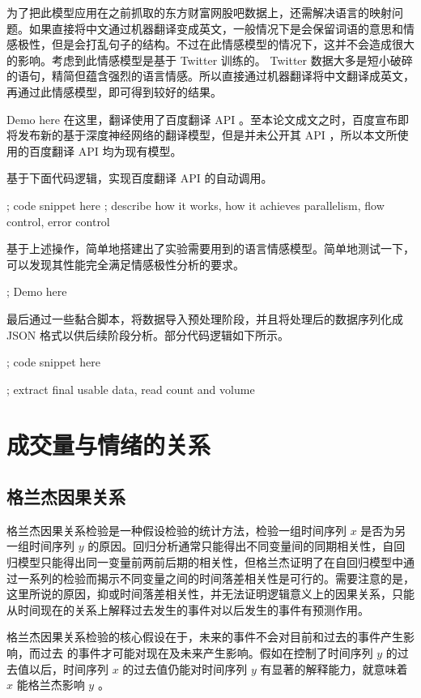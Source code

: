 为了把此模型应用在之前抓取的东方财富网股吧数据上，还需解决语言的映射问题。如果直接将中文通过机器翻译变成英文，一般情况下是会保留词语的意思和情感极性，但是会打乱句子的结构。不过在此情感模型的情况下，这并不会造成很大的影响。考虑到此情感模型是基于 Twitter 训练的。 Twitter 数据大多是短小破碎的语句，精简但蕴含强烈的语言情感。所以直接通过机器翻译将中文翻译成英文，再通过此情感模型，即可得到较好的结果。

Demo here
在这里，翻译使用了百度翻译 API 。至本论文成文之时，百度宣布即将发布新的基于深度神经网络的翻译模型，但是并未公开其 API ，所以本文所使用的百度翻译 API 均为现有模型。

基于下面代码逻辑，实现百度翻译 API 的自动调用。

; code snippet here
; describe how it works, how it achieves parallelism, flow control, error control

基于上述操作，简单地搭建出了实验需要用到的语言情感模型。简单地测试一下，可以发现其性能完全满足情感极性分析的要求。

; Demo here

最后通过一些黏合脚本，将数据导入预处理阶段，并且将处理后的数据序列化成 JSON 格式以供后续阶段分析。部分代码逻辑如下所示。

; code snippet here

; extract final usable data, read count and volume

\chapter{成交量与情绪的关系}

\section{格兰杰因果关系}

格兰杰因果关系检验\cite{granger_causality}是一种假设检验的统计方法，检验一组时间序列 $x$ 是否为另一组时间序列 $y$ 的原因。回归分析通常只能得出不同变量间的同期相关性，自回归模型只能得出同一变量前两前后期的相关性，但格兰杰证明了在自回归模型中通过一系列的检验而揭示不同变量之间的时间落差相关性是可行的。需要注意的是，这里所说的原因，抑或时间落差相关性，并无法证明逻辑意义上的因果关系，只能从时间现在的关系上解释过去发生的事件对以后发生的事件有预测作用。

格兰杰因果关系检验的核心假设在于，未来的事件不会对目前和过去的事件产生影响，而过去
的事件才可能对现在及未来产生影响。假如在控制了时间序列 $y$ 的过去值以后，时间序列 $x$ 的过去值仍能对时间序列 $y$ 有显著的解释能力，就意味着 $x$ 能格兰杰影响 $y$ 。

